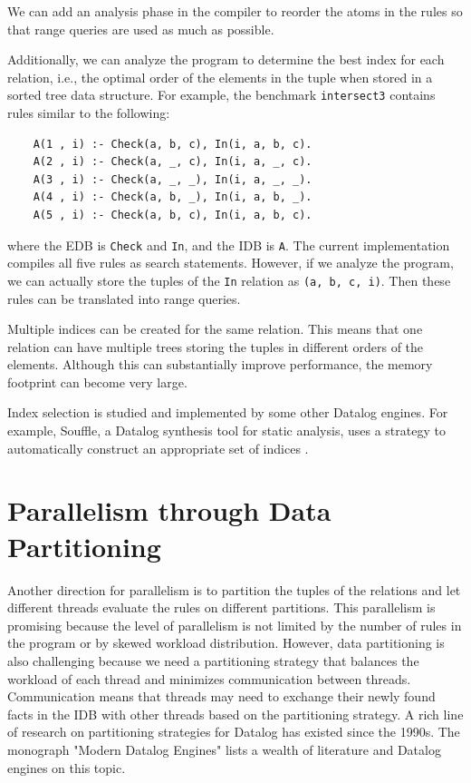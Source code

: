 \documentclass[11pt]{report}
\theoremstyle{definition}
\begin{document}
We can add an analysis phase in the compiler to reorder the atoms in the rules so that range queries are used as much as possible.

Additionally, we can analyze the program to determine the best index for each relation, i.e., the optimal order of the elements in the tuple when stored in a sorted tree data structure. For example, the benchmark \texttt{intersect3} contains rules similar to the following:

\begin{verbatim}
    A(1 , i) :- Check(a, b, c), In(i, a, b, c).
    A(2 , i) :- Check(a, _, c), In(i, a, _, c).
    A(3 , i) :- Check(a, _, _), In(i, a, _, _).
    A(4 , i) :- Check(a, b, _), In(i, a, b, _).
    A(5 , i) :- Check(a, b, c), In(i, a, b, c).
\end{verbatim}

where the EDB is \texttt{Check} and \texttt{In}, and the IDB is \texttt{A}. The current implementation compiles all five rules as search statements. However, if we analyze the program, we can actually store the tuples of the \texttt{In} relation as \texttt{(a, b, c, i)}. Then these rules can be translated into range queries.

Multiple indices can be created for the same relation. This means that one relation can have multiple trees storing the tuples in different orders of the elements. Although this can substantially improve performance, the memory footprint can become very large.

Index selection is studied and implemented by some other Datalog engines. For example, Souffle, a Datalog synthesis tool for static analysis, uses a strategy to automatically construct an appropriate set of indices \cite{10.14778/3282495.3282500}.

\section{Parallelism through Data Partitioning}

Another direction for parallelism is to partition the tuples of the relations and let different threads evaluate the rules on different partitions. This parallelism is promising because the level of parallelism is not limited by the number of rules in the program or by skewed workload distribution. However, data partitioning is also challenging because we need a partitioning strategy that balances the workload of each thread and minimizes communication between threads. Communication means that threads may need to exchange their newly found facts in the IDB with other threads based on the partitioning strategy. A rich line of research on partitioning strategies for Datalog has existed since the 1990s. The monograph "Modern Datalog Engines" \cite{DBS-073} lists a wealth of literature and Datalog engines on this topic.
\end{document}
